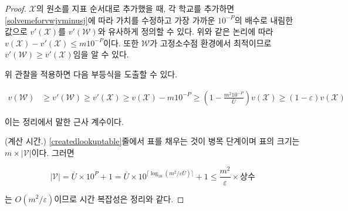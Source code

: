\documentclass[11pt]{article} %
\newif\ifen
\theoremstyle{definition}
\theoremstyle{definition}
\begin{document}
\begin{proof}
\ifen
We can define $v'(\mathcal{X})$ analogously as the fixed-point valuation of $\mathcal{X}$ when its elements are added in index order and its valuation is updated and rounded down to the nearest multiple of $10^{-P}$ at each addition in accordance with \eqref{solvemeforvwjvminusj}. By the same logic, 
$v(\mathcal{X}) - v'(\mathcal{X}) \leq m 10^{-P}$. The optimality of $\mathcal{W}$ in the fixed-point environment implies that $v'(\mathcal{W}) \geq v'(\mathcal{X})$. 
\else
$\mathcal{X}$의 원소를 지표 순서대로 추가했을 때, 각 학교를 추가하면 \eqref{solvemeforvwjvminusj}에 따라 가치를 수정하고 가장 가까운 $10^{-P}$의 배수로 내림한 값으로 $v'(\mathcal{X})$를 $v'(\mathcal{W})$와 유사하게 정의할 수 있다. 위와 같은 논리에 따라 $v(\mathcal{X}) - v'(\mathcal{X}) \leq m 10^{-P}$이다. 또한 $\mathcal{W}$가 고정소수점 환경에서 최적이므로 $v'(\mathcal{W}) \geq v'(\mathcal{X})$임을 알 수 있다.
\fi

\ifen
Applying these observations, we have
\else
위 관찰을 적용하면 다음 부등식을 도출할 수 있다.
\fi
\begin{equation}
\begin{split}
v(\mathcal{W}) &\geq v'(\mathcal{W}) \geq v'(\mathcal{X})
\geq v(\mathcal{X}) - m 10^{-P}
\geq \left(1 - \frac{m^2 10^{-P}}{\bar U}\right) v(\mathcal{X})
\geq \left(1 - \varepsilon\right) v(\mathcal{X})
\end{split}
\end{equation}
\ifen
which establishes the approximation bound. 
\else
이는 정리에서 말한 근사 계수이다.
\fi

\ifen
(Computation time.) The bottleneck step is the creation of the lookup table in line \ref{createdlookuptable}, whose size is $m \times |\mathcal{V}|$. Since
\else
(계산 시간.) \ref{createdlookuptable}줄에서 표를 채우는 것이 병목 단계이며 표의 크기는 $m \times |\mathcal{V}|$이다. 그러면
\fi
\begin{equation}
|\mathcal{V}| = \bar U \times 10^{P} + 1 = \bar U \times 10^ { \bigl\lceil\log_{10}\left(m ^2/ \varepsilon \bar U\right)\bigr\rceil} + 1
\leq\frac{m^2}{\varepsilon} \times \text{\ifen const.\else 상수\fi}
\end{equation}
\ifen
is $O(m^2/ \varepsilon)$, the time complexity is as promised.
\else
는 $O(m^2/ \varepsilon)$이므로 시간 복잡성은 정리와 같다.
\fi%
\end{proof}
\end{document}

